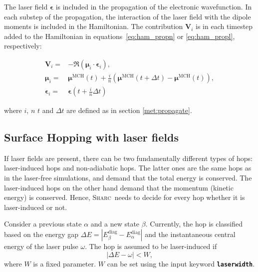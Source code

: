 \documentclass[a4paper,11pt,DIV=15,openany,twoside=false]{scrbook}
\newcommand{\tthdump}[1]{#1}
\newcommand{\sharc}{\textsc{Sharc}}
\newcommand{\ttt}[1]{\textbf{\texttt{#1}}}
\newcommand{\VEC}[1]{\ensuremath{\mathbf{#1}}}
\begin{document}
The laser field $\boldsymbol{\epsilon}$ is included in the propagation of the electronic wavefunction. In each substep of the propagation, the interaction of the laser field with the dipole moments is included in the Hamiltonian. The contribution $\VEC{V}_i$ is in each timestep added to the Hamiltonian in equations~\eqref{eq:ham_propn} or \eqref{eq:ham_propl}, respectively:
\tthdump{
  \begin{align}
    \VEC{V}_i=&
    -
    \Re\left(
      \boldsymbol{\mu}_i\cdot
      \boldsymbol{\epsilon}_i
    \right),\\
    \boldsymbol{\mu}_i=&
    \boldsymbol{\mu}^{\text{MCH}}(t) + \frac{i}{n}
    \left(
      \boldsymbol{\mu}^{\text{MCH}}(t+\Delta t)-\boldsymbol{\mu}^{\text{MCH}}(t)
    \right),\\
    \boldsymbol{\epsilon}_i=&\boldsymbol{\epsilon}\left(t+\frac{i}{n}\Delta t\right)
  \end{align}
}
where $i$, $n$ $t$ and $\Delta t$ are defined as in section \ref{met:propagate}.

\subsection{Surface Hopping with laser fields}

If laser fields are present, there can be two fundamentally different types of hops: laser-induced hops and non-adiabatic hops. The latter ones are the same hops as in the laser-free simulations, and demand that the total energy is conserved. The laser-induced hops on the other hand demand that the momentum (kinetic energy) is conserved. Hence, \sharc\ needs to decide for every hop whether it is laser-induced or not. 

Consider a previous state $\alpha$ and a new state $\beta$. Currently, the hop is classified based on the energy gap $\Delta E=|E_\beta^\text{diag}-E_\alpha^\text{diag}|$ and the instantaneous central energy of the laser pulse $\omega$. 
The hop is assumed to be laser-induced if
\begin{equation}
  |\Delta E-\omega| < W,
\end{equation}
where $W$ is a fixed parameter. $W$ can be set using the input keyword \ttt{laserwidth}.
\end{document}
